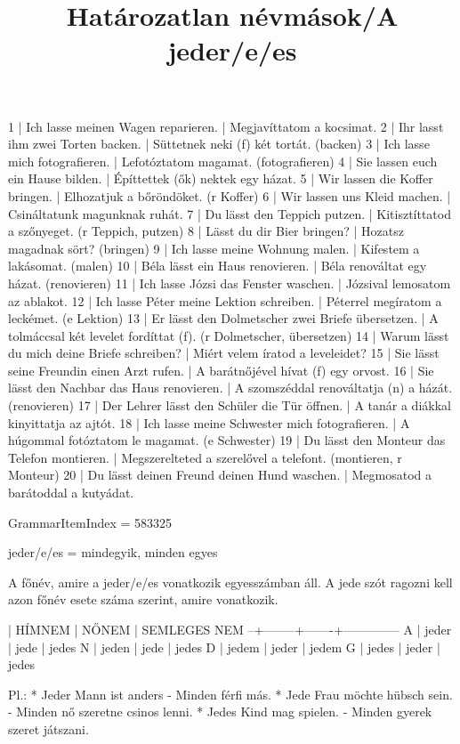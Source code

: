 \begin{exmp}
1 | Ich lasse meinen Wagen reparieren. | Megjavíttatom a kocsimat.
2 | Ihr lasst ihm zwei Torten backen. | Süttetnek neki (f) két tortát. (backen)
3 | Ich lasse mich fotografieren. | Lefotóztatom magamat. (fotografieren)
4 | Sie lassen euch ein Hause bilden. | Építtettek (ők) nektek egy házat.
5 | Wir lassen die Koffer bringen. | Elhozatjuk a bőröndöket. (r Koffer)
6 | Wir lassen uns Kleid machen. | Csináltatunk magunknak ruhát.
7 | Du lässt den Teppich putzen. | Kitisztíttatod a szőnyeget. (r Teppich, putzen)
8 | Lässt du dir Bier bringen? | Hozatsz magadnak sört? (bringen)
9 | Ich lasse meine Wohnung malen. | Kifestem a lakásomat. (malen)
10 | Béla lässt ein Haus renovieren. | Béla renováltat egy házat. (renovieren)
11 | Ich lasse Józsi das Fenster waschen. | Józsival lemosatom az ablakot.
12 | Ich lasse Péter meine Lektion schreiben. | Péterrel megíratom a leckémet. (e Lektion)
13 | Er lässt den Dolmetscher zwei Briefe übersetzen. | A tolmáccsal két levelet fordíttat (f). (r Dolmetscher, übersetzen)
14 | Warum lässt du mich deine Briefe schreiben? | Miért velem íratod a leveleidet?
15 | Sie lässt seine Freundin einen Arzt rufen. | A barátnőjével hívat (f) egy orvost.
16 | Sie lässt den Nachbar das Haus renovieren. | A szomszéddal renováltatja (n) a házát. (renovieren)
17 | Der Lehrer lässt den Schüler die Tür öffnen. | A tanár a diákkal kinyittatja az ajtót.
18 | Ich lasse meine Schwester mich fotografieren. | A húgommal fotóztatom le magamat. (e Schwester)
19 | Du lässt den Monteur das Telefon montieren. | Megszerelteted a szerelővel a telefont. (montieren, r Monteur)
20 | Du lässt deinen Freund deinen Hund waschen. | Megmosatod a barátoddal a kutyádat.
\end{exmp}

\title{Határozatlan névmások/A jeder/e/es}

GrammarItemIndex = 583325

\begin{desc}
jeder/e/es = mindegyik, minden egyes

A főnév, amire a jeder/e/es vonatkozik egyesszámban áll. A jede szót ragozni kell azon főnév esete száma szerint, amire vonatkozik.

  | HÍMNEM | NŐNEM | SEMLEGES NEM
--+--------+-------+--------------
A | jeder  | jede  | jedes
N | jeden  | jede  | jedes
D | jedem  | jeder | jedem
G | jedes  | jeder | jedes

Pl.: * Jeder Mann ist anders - Minden férfi más.
* Jede Frau möchte hübsch sein. - Minden nő szeretne csinos lenni.
* Jedes Kind mag spielen. - Minden gyerek szeret játszani.
\end{desc}

